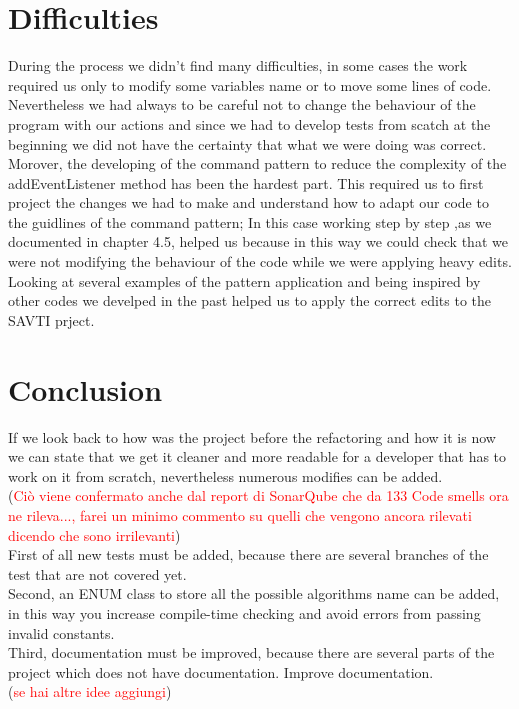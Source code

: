 \documentclass{article}
\begin{document}
\section{Difficulties}
During the process we didn't find many difficulties, in some cases the work required us only to modify some variables name or to move some lines of code. Nevertheless we had always to be careful not to change the behaviour of the program with our actions and since we had to develop tests from scatch at the beginning we did not have the certainty that what we were doing was correct.\\
Morover, the developing of the command pattern to reduce the complexity of the addEventListener method has been the hardest part. This required us to first project the changes we had to make and understand how to adapt our code to the guidlines of the command pattern;
In this case working step by step ,as we documented in chapter 4.5, helped us because in this way we could check that we were not modifying the behaviour of the code while we were applying heavy edits. Looking at several examples of the pattern application and being inspired by other codes we develped in the past helped us to apply the correct edits to the SAVTI prject.


\section{Conclusion}
If we look back to how was the project before the refactoring and how it is now we can state that we get it cleaner and more readable for a developer that has to work on it from scratch, nevertheless numerous modifies can be added.\\
(\textcolor{red}{Ciò viene confermato anche dal report di SonarQube che da 133 Code smells ora ne rileva..., farei un minimo commento su quelli che vengono ancora rilevati dicendo che sono irrilevanti})\\
First of all new tests must be added, because there are several branches of the test that are not covered yet.\\
Second, an ENUM class to store all the possible algorithms name can be added, in this way you increase compile-time checking and avoid errors from passing invalid constants.\\
Third, documentation must be improved, because there are several parts of the project which does not have documentation.
Improve documentation.
\\
(\textcolor{red}{se hai altre idee aggiungi})\\
\end{document}
